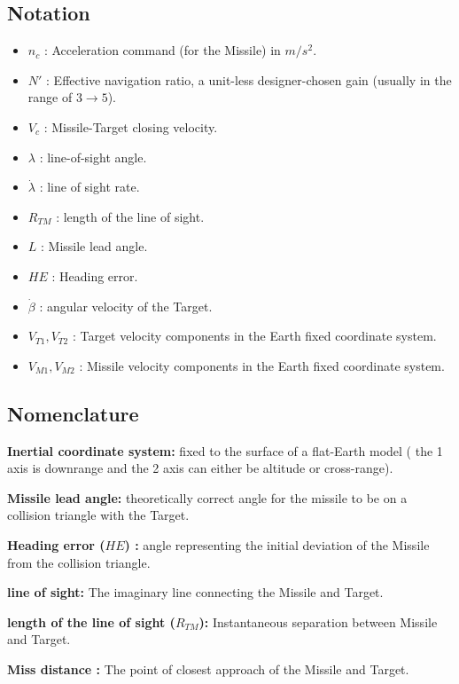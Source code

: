 \subsection*{Notation}
\begin{itemize}
	\item $n_c$ : Acceleration command (for the Missile) in $m/s^2$.
	\item $N'$ : Effective navigation ratio, a unit-less designer-chosen gain (usually in the range of $3\to5$).
	\item $V_c$ : Missile-Target closing velocity.
	\item $\lambda$ : line-of-sight angle.
	\item $\dot{\lambda}$ : line of sight rate.
	\item $R_{TM}$ : length of the line of sight.
	\item $L$ : Missile lead angle.
	\item $HE$ : Heading error.
	\item $\dot{\beta}$ : angular velocity of the Target.
	\item $V_{T1},V_{T2}$ : Target velocity components in the Earth fixed coordinate system.
	\item $V_{M1},V_{M2}$ : Missile velocity components in the Earth fixed coordinate system.
\end{itemize}
\subsection*{Nomenclature}

\textbf{Inertial coordinate system:} fixed to the surface of a flat-Earth model ( the 1 axis is downrange and the 2 axis can either be altitude or cross-range).

\textbf{Missile lead angle:} theoretically correct angle
for the missile to be on a collision triangle with the Target.

\textbf{Heading error ($HE$) :} angle representing the initial deviation of the Missile from the collision triangle.

\textbf{line of sight:} The imaginary line connecting the Missile and Target.

\textbf{length of the line of sight ($R_{TM}$):} Instantaneous separation between Missile and Target.

\textbf{Miss distance :} The point of closest approach of the Missile and Target.

